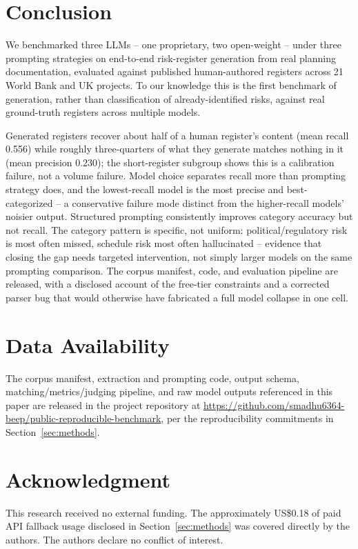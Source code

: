 \documentclass[10pt, conference, letterpaper]{IEEEtran}
\begin{document}
\section{Conclusion}
We benchmarked three LLMs -- one proprietary, two open-weight -- under
three prompting strategies on end-to-end risk-register generation from real
planning documentation, evaluated against published human-authored
registers across 21 World Bank and UK projects. To our knowledge this is
the first benchmark of generation, rather than classification of
already-identified risks, against real ground-truth registers across
multiple models.

Generated registers recover about half of a human register's content (mean
recall 0.556) while roughly three-quarters of what they generate matches
nothing in it (mean precision 0.230); the short-register subgroup shows
this is a calibration failure, not a volume failure. Model choice separates
recall more than prompting strategy does, and the lowest-recall model is
the most precise and best-categorized -- a conservative failure mode
distinct from the higher-recall models' noisier output. Structured
prompting consistently improves category accuracy but not recall. The
category pattern is specific, not uniform: political/regulatory risk is
most often missed, schedule risk most often hallucinated -- evidence that
closing the gap needs targeted intervention, not simply larger models on
the same prompting comparison. The corpus manifest, code, and evaluation
pipeline are released, with a disclosed account of the free-tier
constraints and a corrected parser bug that would otherwise have fabricated
a full model collapse in one cell.

\section*{Data Availability}

The corpus manifest, extraction and prompting code, output schema,
matching/metrics/judging pipeline, and raw model outputs referenced in this
paper are released in the project repository at
\url{https://github.com/smadhu6364-beep/public-reproducible-benchmark}, per
the reproducibility commitments in Section~\ref{sec:methods}.

\section*{Acknowledgment}

This research received no external funding. The approximately US\$0.18 of
paid API fallback usage disclosed in Section~\ref{sec:methods} was covered
directly by the authors. The authors declare no conflict of interest.

\balance


\end{document}
